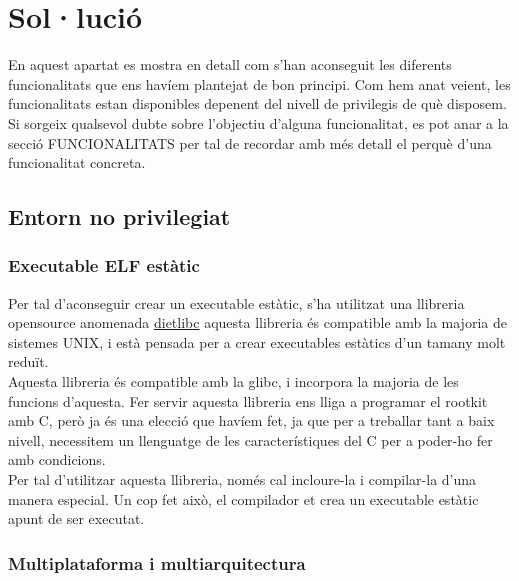 \chapter{Sol·lució}

En aquest apartat es mostra en detall com s'han aconseguit les diferents funcionalitats que ens havíem plantejat de bon principi.
Com hem anat veient, les funcionalitats estan disponibles depenent del nivell de privilegis de què disposem. \\

Si sorgeix qualsevol dubte sobre l'objectiu d'alguna funcionalitat, es pot anar a la secció FUNCIONALITATS per tal de recordar amb més 
detall el perquè d'una funcionalitat concreta. \\

\section{Entorn no privilegiat}

\subsection{Executable ELF estàtic}

Per tal d'aconseguir crear un executable estàtic, s'ha utilitzat una llibreria opensource anomenada 
\href{http://www.google.es/url?sa=t&source=web&ct=res&cd=1&url=http%3A%2F%2Fwww.fefe.de%2Fdietlibc%2F&ei=zZRQStz4PMWrjAftmrinBQ&usg=AFQjCNFno9JYqJ06mbfgwKIZS5J-6zPYEw&sig2=WuvuDzhCaMMslcwtL4xa2A}{dietlibc}
aquesta llibreria és compatible amb la majoria de sistemes UNIX, i està pensada per a crear executables estàtics d'un tamany 
molt reduït. \\

Aquesta llibreria és compatible amb la glibc, i incorpora la majoria de les funcions d'aquesta. Fer servir aquesta llibreria
ens lliga a programar el rootkit amb C, però ja és una elecció que havíem fet, ja que per a treballar tant a baix nivell,
necessitem un llenguatge de les característiques del C per a poder-ho fer amb condicions.\\

Per tal d'utilitzar aquesta llibreria, només cal incloure-la i compilar-la d'una manera especial. Un cop fet això, el compilador et crea un 
executable estàtic apunt de ser executat.

\subsection{Multiplataforma i multiarquitectura}

